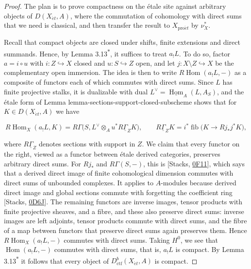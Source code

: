 \documentclass[11pt]{article}
\newcommand{\bpout}[1]{#1\textsuperscript{\hyperlink{bp-outside}{\ensuremath{\ast}}}}
\providecommand{\Hom}{}\renewcommand{\Hom}{\operatorname{Hom}}
\providecommand{\fib}{}\renewcommand{\fib}{\operatorname{fib}}
\begin{document}
\begin{proof}[{Proof}]\label{bp46}%
The plan is to prove compactness on the étale site against arbitrary objects of \(D(X_{\acute{e}t},A)\), where the commutation of cohomology with direct sums that we need is classical, and then transfer the result to \(X_{\mathrm{pro}\acute{e}t}\) by \(\nu_X^*\).

Recall that compact objects are closed under shifts, finite extensions and direct summands. Hence, by Lemma \bpout{3.13}, it suffices to treat \(a_!L\). To do so, factor \(a=i\circ u\) with \(i:Z\hookrightarrow X\) closed and \(u:S\hookrightarrow Z\) open, and let \(j:X\setminus Z\hookrightarrow X\) be the complementary open immersion. The idea is then to write \(R\!\operatorname{Hom}(a_!L,-)\) as a composite of functors each of which commutes with direct sums. Since \(L\) has finite projective stalks, it is dualizable with dual \(L^\vee=\underline{\operatorname{Hom}}_A(L,A_S)\), and the étale form of Lemma lemma-sections-support-closed-subscheme shows that for \(K\in D(X_{\acute{e}t},A)\) we have

\[
R\!\operatorname{Hom}_X(a_!L,K)
=R\Gamma\bigl(S,L^\vee\otimes_A u^*R\underline\Gamma_ZK\bigr),
\qquad R\underline\Gamma_ZK=i^*\fib\bigl(K\to Rj_*j^*K\bigr),
\]

where \(R\underline\Gamma_Z\) denotes sections with support in \(Z\). We claim that every functor on the right, viewed as a functor between étale derived categories, preserves arbitrary direct sums. For \(Rj_*\) and \(R\Gamma(S,-)\), this is [Stacks, \href{https://stacks.math.columbia.edu/tag/0F11}{0F11}], which says that a derived direct image of finite cohomological dimension commutes with direct sums of unbounded complexes. It applies to \(A\)-modules because derived direct image and global sections commute with forgetting the coefficient ring [Stacks, \href{https://stacks.math.columbia.edu/tag/0D6J}{0D6J}]. The remaining functors are inverse images, tensor products with finite projective sheaves, and a fibre, and these also preserve direct sums: inverse images are left adjoints, tensor products commute with direct sums, and the fibre of a map between functors that preserve direct sums again preserves them. Hence \(R\!\operatorname{Hom}_X(a_!L,-)\) commutes with direct sums. Taking \(H^0\), we see that \(\Hom(a_!L,-)\) commutes with direct sums, that is, \(a_!L\) is compact. By Lemma \bpout{3.13} it follows that every object of \(D^b_{\mathrm{ctf}}(X_{\acute{e}t},A)\) is compact.


\end{proof}
\end{document}
